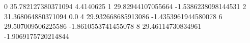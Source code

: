 0 35.782127380371094 4.4140625
1 29.82944107055664 -1.5386238098144531
2 31.368064880371094 0.0
4 29.932668685913086 -1.4353961944580078
6 29.507009506225586 -1.8610553741455078
8 29.46114730834961 -1.9069175720214844
